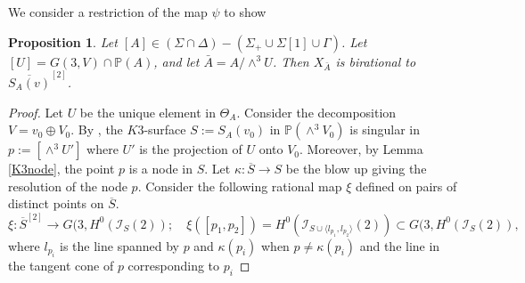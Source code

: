 \documentclass[a4paper,11pt]{amsart}
\newtheorem{prop}[thm]{Proposition}
\theoremstyle{definition}
\numberwithin{equation}{section}
\numberwithin{equation}{section} \theoremstyle{definition}
\begin{document}
We consider a restriction of the map $\psi $ to show

 
  
  
 
  
 
  
  
      \begin{prop}\label{prop3.6} Let $[A]\in (\Sigma\cap \Delta)-(\Sigma_+\cup \Sigma[1]\cup \Gamma)$. Let $[U]=G(3,V)\cap {{\mathbb{P}}}(A)$, and let ${\bar{A}}=A/\wedge^3U$.
      Then $X_{\bar{A}}$ is birational to $\overline{S_A(v)}^{[2]}$.
 \end{prop}
 \medskip
 \begin{proof} 
 Let $U$ be the unique element in $\Theta_A$. Consider the decomposition $V=v_0\oplus V_0$. By  \cite[Corollary~4.7]{Ogrady-michigan}, the $K3$-surface $S:=S_A(v_0)$ 
 in $\mathbb{P}(\wedge^3 V_0)$ is singular in $p:=[\wedge^3 U']$ where $U'$ is the projection of $U$ onto $V_0$. Moreover, by Lemma \ref{K3node}, the point $p$ is a node in $S$. 
 Let $\kappa: \overline{S} \to S$ be the blow up giving the resolution of the node $p$. Consider the following rational map $\xi$ defined on pairs of distinct points on $\overline{S}$.
$$\xi: \overline{S}^{[2]}\to G(3, H^0(\mathcal{I}_S(2));\quad \xi([ p_1,p_2 ] ) = H^0(\mathcal{I}_{S\cup \langle l_{p_1},l_{p_2}\rangle}(2))  \subset G(3, H^0(\mathcal{I}_S(2)),$$
where 
  $l_{p_i}$ is the line spanned by $p$ and $ \kappa (p_i)$ when  $p\neq \kappa (p_i)$ and  the line in the tangent cone of $p$ corresponding to $p_i$
  

\end{proof}
\end{document}

